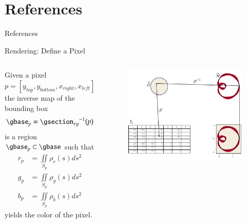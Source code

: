 \documentclass[xcolor={dvipsnames}, handout]{beamer}
\begin{document}
\section{References}
\begin{frame}[allowframebreaks]{References}
\printbibliography
\end{frame}
\appendix 
\begin{frame}{Rendering: Define a Pixel}
    \begin{columns}
        Given a pixel
        \begin{equation}
        p=\left[y_{top}, y_{bottom}, x_{right}, x_{left}\right]
        \end{equation}
        the inverse map of the bounding box 
        \begin{equation}
        \gbase_{p} ={\gsection_{xy}}^{-1}(p)
        \end{equation}
        is a region $\gbase_p \subset \gbase$ such that 
        \begin{align}
            \scriptstyle r_p &= \scriptstyle \iint\limits_{S_p} \rho_r(s)ds^{2}\\
            \scriptstyle g_p &= \scriptstyle \iint\limits_{S_p} \rho_g(s)ds^{2}\\
            \scriptstyle  b_p &= \scriptstyle \iint\limits_{S_p} \rho_b(s)ds^{2}
        \end{align}
        yields the color of the pixel. 
        \begin{figure}[H]
            \includegraphics[width=\textwidth]{figures/math/render.png}
        \end{figure}
    \end{columns}
\end{frame}
\end{document}
